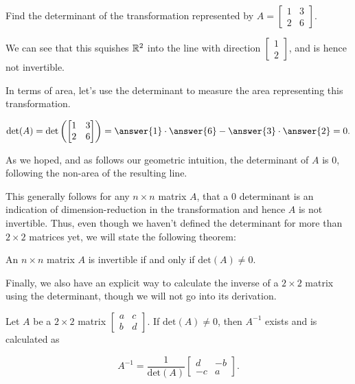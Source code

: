 \documentclass{ximera}
\begin{document}
  \begin{example}
    Find the determinant of the transformation represented by $A=\begin{bmatrix}
      1 &3\\2&6
    \end{bmatrix}$. 

    We can see that this squishes $\mathbb{R}^2$ into the line with direction $\begin{bmatrix}
      1\\2
    \end{bmatrix}$, and is hence not invertible. 

    In terms of area, let's use the determinant to measure the area representing this transformation. 

    $$\mbox{det}(A)=\mbox{det}\left(\begin{bmatrix}
      1&3\\2&6
    \end{bmatrix}\right)=\answer{1}\cdot \answer{6}-\answer{3}\cdot \answer{2}=0.$$

    As we hoped, and as follows our geometric intuition, the determinant of $A$ is $0$, following the non-area of the resulting line.
  \end{example}

  This generally follows for any $n\times n$ matrix $A$, that a $0$ determinant is an indication of dimension-reduction in the transformation and hence $A$ is not invertible. Thus, even though we haven't defined the determinant for more than $2\times 2$ matrices yet, we will state the following theorem:

  \begin{theorem}
    An $n\times n$ matrix $A$ is invertible if and only if $\mbox{det}(A)\neq 0$. 
  \end{theorem}

  Finally, we also have an explicit way to calculate the inverse of a $2\times 2$ matrix using the determinant, though we will not go into its derivation.

  \begin{theorem}
    Let $A$ be a $2\times 2$ matrix $\begin{bmatrix}
    a&c\\b&d
    \end{bmatrix}$. If $\mbox{det}(A)\neq 0$, then $A^{-1}$ exists and is calculated as 

    $$A^{-1}=\frac{1}{\mbox{det}(A)}\begin{bmatrix}
      d &-b \\-c&a
    \end{bmatrix}.$$
  \end{theorem}
\end{document}
